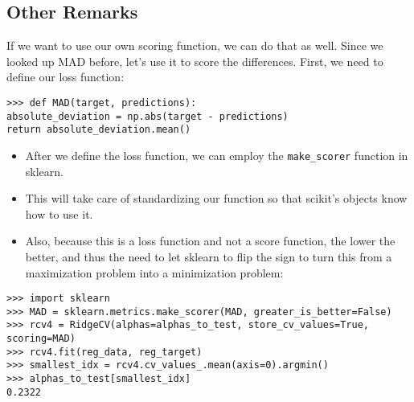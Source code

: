 \documentclass[SKL-MASTER.tex]{subfiles}
\begin{document}
\subsection*{Other Remarks}
If we want to use our own scoring function, we can do that as well. Since we looked up MAD
before, let's use it to score the differences. First, we need to define our loss function:
\begin{framed}
\begin{verbatim}
>>> def MAD(target, predictions):
absolute_deviation = np.abs(target - predictions)
return absolute_deviation.mean()
\end{verbatim}
\end{framed}
\begin{itemize}
\item After we define the loss function, we can employ the \texttt{make\_scorer} function in sklearn.
\item This will take care of standardizing our function so that scikit's objects know how to use it.
\item Also, because this is a loss function and not a score function, the lower the better, and thus
the need to let sklearn to flip the sign to turn this from a maximization problem into a
minimization problem:
\end{itemize}

\begin{framed}
\begin{verbatim}
>>> import sklearn
>>> MAD = sklearn.metrics.make_scorer(MAD, greater_is_better=False)
>>> rcv4 = RidgeCV(alphas=alphas_to_test, store_cv_values=True,
scoring=MAD)
>>> rcv4.fit(reg_data, reg_target)
>>> smallest_idx = rcv4.cv_values_.mean(axis=0).argmin()
>>> alphas_to_test[smallest_idx]
0.2322
\end{verbatim}
\end{framed}

\end{document}
